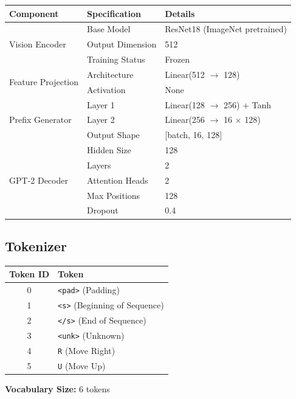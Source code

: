 \documentclass[11pt,a4paper]{article}
\begin{document}
\begin{center}
\begin{tabular}{lll}
\toprule
\textbf{Component} & \textbf{Specification} & \textbf{Details} \\
\midrule
\multirow{3}{*}{Vision Encoder} & Base Model & ResNet18 (ImageNet pretrained) \\
& Output Dimension & 512 \\
& Training Status & Frozen \\
\midrule
\multirow{2}{*}{Feature Projection} & Architecture & Linear(512 $\rightarrow$ 128) \\
& Activation & None \\
\midrule
\multirow{3}{*}{Prefix Generator} & Layer 1 & Linear(128 $\rightarrow$ 256) + Tanh \\
& Layer 2 & Linear(256 $\rightarrow$ 16 $\times$ 128) \\
& Output Shape & [batch, 16, 128] \\
\midrule
\multirow{5}{*}{GPT-2 Decoder} & Hidden Size & 128 \\
& Layers & 2 \\
& Attention Heads & 2 \\
& Max Positions & 128 \\
& Dropout & 0.4 \\
\bottomrule
\end{tabular}
\end{center}

\subsection{Tokenizer}

\begin{center}
\begin{tabular}{cl}
\toprule
\textbf{Token ID} & \textbf{Token} \\
\midrule
0 & \texttt{<pad>} (Padding) \\
1 & \texttt{<s>} (Beginning of Sequence) \\
2 & \texttt{</s>} (End of Sequence) \\
3 & \texttt{<unk>} (Unknown) \\
4 & \texttt{R} (Move Right) \\
5 & \texttt{U} (Move Up) \\
\bottomrule
\end{tabular}
\end{center}

\textbf{Vocabulary Size:} 6 tokens
\end{document}
